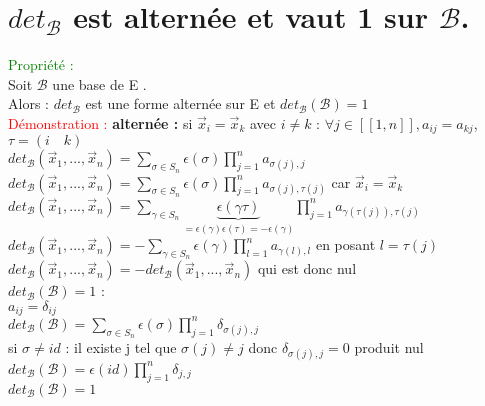 \documentclass{article}
\begin{document}
	\section{$det_{\mathcal B}$ est alternée et vaut 1 sur $\mathcal B$.}
	\textcolor{green}{Propriété :} \\
	Soit $\mathcal B$ une base de E . \\
	Alors : $det_{\mathcal{B}}$ est une forme alternée sur E et $det_{\mathcal B}(\mathcal B)=1$ \\
	\textcolor{red}{Démonstration :}
	{\bf alternée :} si $\vec x_i= \vec x_k$ avec $i\neq k$ :
	$\forall j \in [[1,n]],a_{ij}=a_{kj}$, $\tau=( i \quad k)$ \\
	$det_{\mathcal B}(\vec x_1,..., \vec x_n) = \sum_{\sigma \in S_n} \epsilon(\sigma) \prod_{j=1}^n a_{\sigma(j),j}$ \\
	$det_{\mathcal B}(\vec x_1,..., \vec x_n) = \sum_{\sigma \in S_n} \epsilon(\sigma) \prod_{j=1}^n   a_{\sigma(j),\tau(j)}$ car $\vec x_i= \vec x_k$ \\
	$det_{\mathcal B}(\vec x_1,..., \vec x_n) = \sum_{\gamma \in S_n} \underbrace{\epsilon(\gamma \tau)}_{=\epsilon(\gamma)\epsilon(\tau)=-\epsilon(\gamma)} \prod_{j=1}^n a_{\gamma(\tau(j)),\tau(j)}$ \\
	$det_{\mathcal B}(\vec x_1,..., \vec x_n) = - \sum_{\gamma \in S_n} \epsilon(\gamma) \prod_{l=1}^n a_{\gamma(l),l}$ en posant $l=\tau(j)$ \\
	$det_{\mathcal B}(\vec x_1,..., \vec x_n) = -det_{\mathcal B}(\vec x_1,...,\vec x_n) $ qui est donc nul \\
	{\boldmath $det_{\mathcal B}(\mathcal B)=1$ :} \\
	$a_{ij}=\delta_{ij}$ \\
		$det_{\mathcal B}(\mathcal B)= \sum_{\sigma \in S_n} \epsilon(\sigma) \prod_{j=1}^n \delta_{\sigma(j),j}$ \\
	si $\sigma\neq id$ : il existe j tel que $\sigma(j)\neq j$ donc $\delta_{\sigma(j),j}=0$ produit nul \\
	$det_{\mathcal B}(\mathcal B)= \epsilon(id) \prod_{j=1}^n \delta_{j,j}$ \\
	$det_{\mathcal B}(\mathcal B)= 1$
\end{document}
